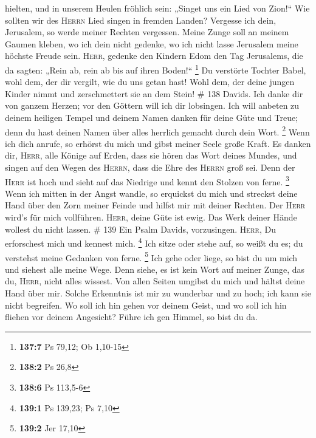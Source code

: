 hielten, und in unserem Heulen fröhlich sein: „Singet uns ein Lied von
Zion!{}``  Wie sollten wir des \textsc{Herrn} Lied singen
in fremden Landen?  Vergesse ich dein, Jerusalem, so werde
meiner Rechten vergessen.  Meine Zunge soll an meinem
Gaumen kleben, wo ich dein nicht gedenke, wo ich nicht lasse Jerusalem
meine höchste Freude sein.  \textsc{Herr}, gedenke den
Kindern Edom den Tag Jerusalems, die da sagten: „Rein ab, rein ab bis
auf ihren Boden!{}`` \footnote{\textbf{137:7} Ps 79,12; Ob 1,10-15}
 Du verstörte Tochter Babel, wohl dem, der dir vergilt,
wie du uns getan hast!  Wohl dem, der deine jungen Kinder
nimmt und zerschmettert sie an dem Stein! \# 138  Davids.
Ich danke dir von ganzem Herzen; vor den Göttern will ich dir lobsingen.
 Ich will anbeten zu deinem heiligen Tempel und deinem
Namen danken für deine Güte und Treue; denn du hast deinen Namen über
alles herrlich gemacht durch dein Wort. \footnote{\textbf{138:2} Ps 26,8}
 Wenn ich dich anrufe, so erhörst du mich und gibst meiner
Seele große Kraft.  Es danken dir, \textsc{Herr}, alle
Könige auf Erden, dass sie hören das Wort deines Mundes, 
und singen auf den Wegen des \textsc{Herrn}, dass die Ehre des
\textsc{Herrn} groß sei.  Denn der \textsc{Herr} ist hoch
und sieht auf das Niedrige und kennt den Stolzen von ferne. \footnote{\textbf{138:6}
  Ps 113,5-6}  Wenn ich mitten in der Angst wandle, so
erquickst du mich und streckst deine Hand über den Zorn meiner Feinde
und hilfst mir mit deiner Rechten.  Der \textsc{Herr}
wird's für mich vollführen. \textsc{Herr}, deine Güte ist ewig. Das Werk
deiner Hände wollest du nicht lassen. \# 139  Ein Psalm
Davids, vorzusingen. \textsc{Herr}, Du erforschest mich und kennest
mich. \footnote{\textbf{139:1} Ps 139,23; Ps 7,10}  Ich
sitze oder stehe auf, so weißt du es; du verstehst meine Gedanken von
ferne. \footnote{\textbf{139:2} Jer 17,10}  Ich gehe oder
liege, so bist du um mich und siehest alle meine Wege. 
Denn siehe, es ist kein Wort auf meiner Zunge, das du, \textsc{Herr},
nicht alles wissest.  Von allen Seiten umgibst du mich und
hältst deine Hand über mir.  Solche Erkenntnis ist mir zu
wunderbar und zu hoch; ich kann sie nicht begreifen.  Wo
soll ich hin gehen vor deinem Geist, und wo soll ich hin fliehen vor
deinem Angesicht?  Führe ich gen Himmel, so bist du da.
